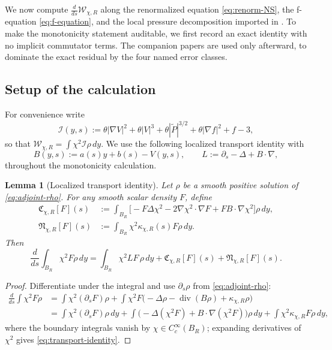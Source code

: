 \documentclass[11pt]{amsart}
\numberwithin{equation}{section}
\theoremstyle{plain}
\newtheorem{lemma}[theorem]{Lemma}
\theoremstyle{definition}
\theoremstyle{remark}
\newcommand{\Wloc}{\mathcal W}
\newcommand{\diver}{\operatorname{div}}
\newcommand{\kappachi}{\kappa_{\chi,R}}
\begin{document}
We now compute \(\frac{d}{ds}\Wloc_{\chi,R}\) along the renormalized
equation \eqref{eq:renorm-NS}, the f-equation \eqref{eq:f-equation}, and
the local pressure decomposition imported in .
To make the
monotonicity statement auditable, we first record an exact identity with no
implicit commutator terms.  The companion papers are used only afterward,
to dominate the exact residual by the four named error classes.

\subsection{Setup of the calculation}

For convenience write
\begin{equation}\label{eq:integrand}
	\mathcal I(y,s):=\theta |\nabla V|^2+\theta |V|^3
	+\theta |\widetilde P|^{3/2}+\theta |\nabla f|^2+f-3,
\end{equation}
so that \(\Wloc_{\chi,R}=\int\chi^2\mathcal I\rho\,dy\).  We use the
following localized transport identity with
\[
	B(y,s):=a(s)y+b(s)-V(y,s),\qquad
	L:=\partial_s-\Delta+B\cdot\nabla,
\]
throughout the monotonicity calculation.

\begin{lemma}[Localized transport identity]
\label{lem:localized-transport-identity}
Let \(\rho\) be a smooth positive solution of \eqref{eq:adjoint-rho}.  For
any smooth scalar density \(F\), define
\begin{align}
	\mathfrak C_{\chi,R}[F](s)
	&:=\int_{B_R}\bigl[
	-F\Delta\chi^2-2\nabla\chi^2\cdot\nabla F
	+F B\cdot\nabla\chi^2\bigr]\rho\,dy,\label{eq:cutoff-functional}\\
	\mathfrak N_{\chi,R}[F](s)
	&:=\int_{B_R}\chi^2\kappachi(s)F\rho\,dy.\label{eq:normalizer-functional}
\end{align}
Then
\begin{equation}\label{eq:transport-identity}
	\frac{d}{ds}\int_{B_R}\chi^2 F\rho\,dy
	=\int_{B_R}\chi^2 L F\,\rho\,dy
	+\mathfrak C_{\chi,R}[F](s)
	+\mathfrak N_{\chi,R}[F](s).
\end{equation}
\end{lemma}

\begin{proof}
Differentiate under the integral and use \(\partial_s\rho\) from
\eqref{eq:adjoint-rho}:
\[
\begin{aligned}
	\frac{d}{ds}\int\chi^2F\rho
	&=\int\chi^2(\partial_sF)\rho
	+\int\chi^2F\bigl(-\Delta\rho-\diver(B\rho)+\kappachi\rho\bigr)\\
	&=\int\chi^2(\partial_sF)\rho\,dy
	+\int\bigl(-\Delta(\chi^2F)+B\cdot\nabla(\chi^2F)\bigr)\rho\,dy
	+\int\chi^2\kappachi F\rho\,dy,
\end{aligned}
\]
where the boundary integrals vanish by \(\chi\in C_c^\infty(B_R)\);
expanding derivatives of \(\chi^2\) gives
\eqref{eq:transport-identity}.
\end{proof}
\end{document}
